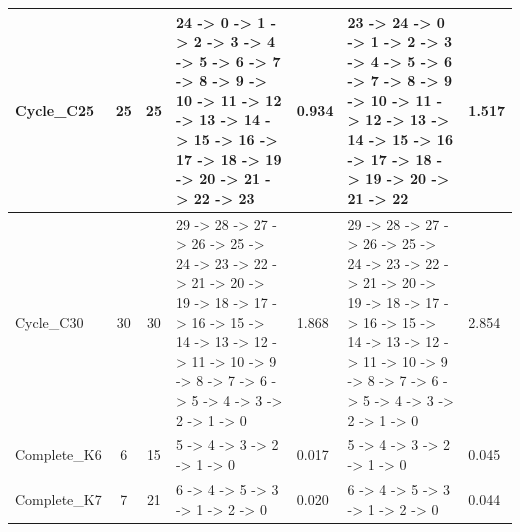 \documentclass[8pt]{article}
\begin{document}
\begin{longtable}{@{}L{3.2cm} c c L{4cm} L{1.2cm} L{4cm} L{1.2cm}@{}}
\midrule
Cycle\_C25 & 25 & 25 & 24 -\textgreater{} 0 -\textgreater{} 1 -\textgreater{} 2 -\textgreater{} 3 -\textgreater{} 4 -\textgreater{} 5 -\textgreater{} 6 -\textgreater{} 7 -\textgreater{} 8 -\textgreater{} 9 -\textgreater{} 10 -\textgreater{} 11 -\textgreater{} 12 -\textgreater{} 13 -\textgreater{} 14 -\textgreater{} 15 -\textgreater{} 16 -\textgreater{} 17 -\textgreater{} 18 -\textgreater{} 19 -\textgreater{} 20 -\textgreater{} 21 -\textgreater{} 22 -\textgreater{} 23 & 0.934 & 23 -\textgreater{} 24 -\textgreater{} 0 -\textgreater{} 1 -\textgreater{} 2 -\textgreater{} 3 -\textgreater{} 4 -\textgreater{} 5 -\textgreater{} 6 -\textgreater{} 7 -\textgreater{} 8 -\textgreater{} 9 -\textgreater{} 10 -\textgreater{} 11 -\textgreater{} 12 -\textgreater{} 13 -\textgreater{} 14 -\textgreater{} 15 -\textgreater{} 16 -\textgreater{} 17 -\textgreater{} 18 -\textgreater{} 19 -\textgreater{} 20 -\textgreater{} 21 -\textgreater{} 22 & 1.517 \\
\midrule
Cycle\_C30 & 30 & 30 & 29 -\textgreater{} 28 -\textgreater{} 27 -\textgreater{} 26 -\textgreater{} 25 -\textgreater{} 24 -\textgreater{} 23 -\textgreater{} 22 -\textgreater{} 21 -\textgreater{} 20 -\textgreater{} 19 -\textgreater{} 18 -\textgreater{} 17 -\textgreater{} 16 -\textgreater{} 15 -\textgreater{} 14 -\textgreater{} 13 -\textgreater{} 12 -\textgreater{} 11 -\textgreater{} 10 -\textgreater{} 9 -\textgreater{} 8 -\textgreater{} 7 -\textgreater{} 6 -\textgreater{} 5 -\textgreater{} 4 -\textgreater{} 3 -\textgreater{} 2 -\textgreater{} 1 -\textgreater{} 0 & 1.868 & 29 -\textgreater{} 28 -\textgreater{} 27 -\textgreater{} 26 -\textgreater{} 25 -\textgreater{} 24 -\textgreater{} 23 -\textgreater{} 22 -\textgreater{} 21 -\textgreater{} 20 -\textgreater{} 19 -\textgreater{} 18 -\textgreater{} 17 -\textgreater{} 16 -\textgreater{} 15 -\textgreater{} 14 -\textgreater{} 13 -\textgreater{} 12 -\textgreater{} 11 -\textgreater{} 10 -\textgreater{} 9 -\textgreater{} 8 -\textgreater{} 7 -\textgreater{} 6 -\textgreater{} 5 -\textgreater{} 4 -\textgreater{} 3 -\textgreater{} 2 -\textgreater{} 1 -\textgreater{} 0 & 2.854 \\
\midrule
Complete\_K6 & 6 & 15 & 5 -\textgreater{} 4 -\textgreater{} 3 -\textgreater{} 2 -\textgreater{} 1 -\textgreater{} 0 & 0.017 & 5 -\textgreater{} 4 -\textgreater{} 3 -\textgreater{} 2 -\textgreater{} 1 -\textgreater{} 0 & 0.045 \\
\midrule
Complete\_K7 & 7 & 21 & 6 -\textgreater{} 4 -\textgreater{} 5 -\textgreater{} 3 -\textgreater{} 1 -\textgreater{} 2 -\textgreater{} 0 & 0.020 & 6 -\textgreater{} 4 -\textgreater{} 5 -\textgreater{} 3 -\textgreater{} 1 -\textgreater{} 2 -\textgreater{} 0 & 0.044 \\

\end{longtable}
\end{document}
